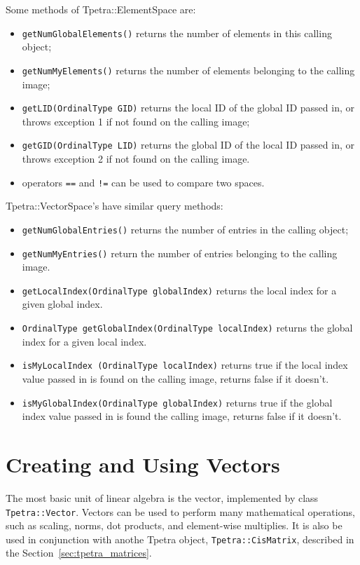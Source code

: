 Some methods of Tpetra::ElementSpace are:
\begin{itemize}
\itemsep=1pt
\item {\tt getNumGlobalElements()} returns the number of elements in this
calling object;
\item {\tt getNumMyElements()} returns the number of elements belonging to
the calling image;
\item {\tt getLID(OrdinalType GID)} returns the local ID of the global 
ID passed in, or throws exception 1 if not found on the calling image;
\item {\tt getGID(OrdinalType LID)} returns the global ID of the local 
ID passed in, or throws exception 2 if not found on the calling image. 
\item operators \verb!==! and \verb$!=$ can be used to compare two spaces.
\end{itemize}
Tpetra::VectorSpace's have similar query methods:
\begin{itemize}
\itemsep=1pt
\item {\tt getNumGlobalEntries()} returns the number of entries in the 
calling object;
\item {\tt getNumMyEntries()} return the number of entries belonging to the
calling image. 
\item {\tt getLocalIndex(OrdinalType globalIndex)} returns
the local index for a given global index.
\item {\tt OrdinalType getGlobalIndex(OrdinalType localIndex)} returns
the global index for a given local index.
\item {\tt isMyLocalIndex (OrdinalType localIndex)} returns true if the local
index value passed in is found on the calling image, returns false if it
doesn't.
\item {\tt isMyGlobalIndex(OrdinalType globalIndex)} returns
true if the global index value passed in is found the calling
image, returns false if it doesn't. 
\end{itemize}


\section{Creating and Using Vectors}
\label{sec:tpetra_vectors}

The most basic unit of linear algebra is the vector, implemented by class {\tt
  Tpetra::Vector}. Vectors can be used to perform many mathematical
  operations, such as scaling, norms, dot products, and element-wise
  multiplies. It is also be used in conjunction with anothe Tpetra object,
{\tt Tpetra::CisMatrix}, described in the Section~\ref{sec:tpetra_matrices}.

